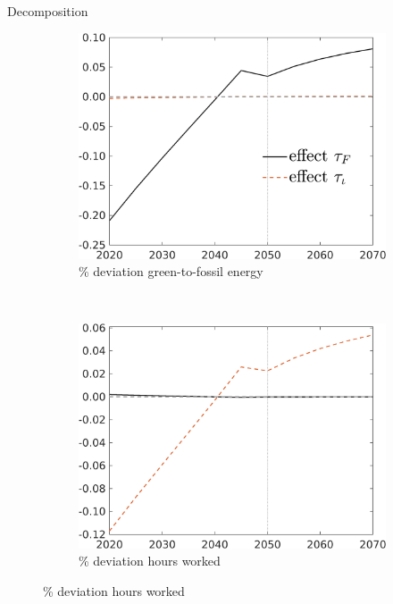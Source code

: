 \documentclass[11pt,aspectratio=169]{beamer}
\begin{document}
\begin{frame}{Decomposition}
\hypertarget{decomp}{}
\centering

\begin{figure}[h!!]
	\centering
	\begin{subfigure}{0.4\textwidth}		
		\caption{{\% deviation  green-to-fossil energy }}
		\includegraphics[width=1\textwidth]{../codding_model/own_basedOnFried/optimalPol_010922_revision/figures/all_13Sept22_Tplus30/CountTAUF_Both_Opt_target_GFF_nsk0_xgr0_knspil0_regime4_spillover0_sep0_extern0_PV1_etaa0.79_lgd1.png}
	\end{subfigure}
	\begin{minipage}[]{0.1\textwidth}
		\
	\end{minipage}
	\begin{subfigure}{0.4\textwidth}		
		\caption{{\% deviation hours worked}}
		\includegraphics[width=1\textwidth]{../codding_model/own_basedOnFried/optimalPol_010922_revision/figures/all_13Sept22_Tplus30/CountTAUF_Both_Opt_target_Hagg_nsk0_xgr0_knspil0_regime4_spillover0_sep0_extern0_PV1_etaa0.79_lgd0.png}

\end{subfigure}
\end{figure}
\end{frame}
\end{document}
